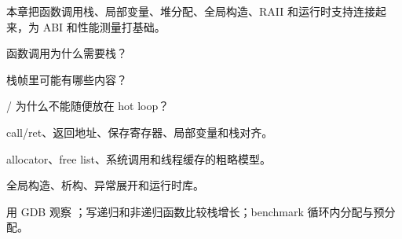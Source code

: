 {本章把函数调用栈、局部变量、堆分配、全局构造、RAII 和运行时支持连接起来，为 ABI 和性能测量打基础。}
{\item 函数调用为什么需要栈？
\item 栈帧里可能有哪些内容？
\item {}/ 为什么不能随便放在 hot loop？}
{\item call/ret、返回地址、保存寄存器、局部变量和栈对齐。
\item allocator、free list、系统调用和线程缓存的粗略模型。
\item 全局构造、析构、异常展开和运行时库。}
{用 GDB 观察 ；写递归和非递归函数比较栈增长；benchmark 循环内分配与预分配。}

